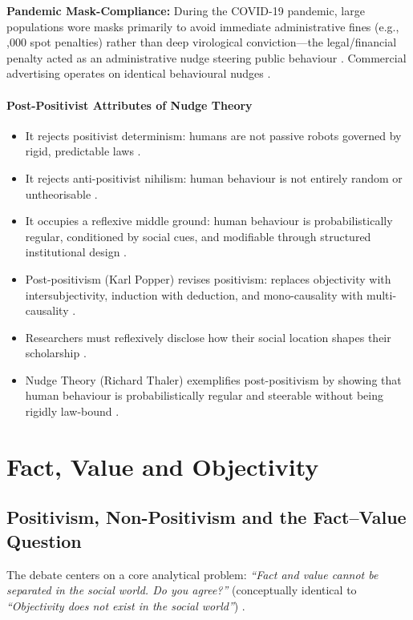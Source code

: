 \begin{ExampleBox}
\textbf{Pandemic Mask-Compliance:} During the COVID-19 pandemic, large populations wore masks primarily to avoid immediate administrative fines (e.g., ,000 spot penalties) rather than deep virological conviction---the legal/financial penalty acted as an administrative nudge steering public behaviour . Commercial advertising operates on identical behavioural nudges .
\end{ExampleBox}

\paragraph{Post-Positivist Attributes of Nudge Theory}
\begin{itemize}
    \item It rejects positivist determinism: humans are not passive robots governed by rigid, predictable laws .
    \item It rejects anti-positivist nihilism: human behaviour is not entirely random or untheorisable .
    \item It occupies a reflexive middle ground: human behaviour is probabilistically regular, conditioned by social cues, and modifiable through structured institutional design .
\end{itemize}

\begin{QuickRevision}
\begin{itemize}
    \item Post-positivism (Karl Popper) revises positivism: replaces objectivity with intersubjectivity, induction with deduction, and mono-causality with multi-causality .
    \item Researchers must reflexively disclose how their social location shapes their scholarship .
    \item Nudge Theory (Richard Thaler) exemplifies post-positivism by showing that human behaviour is probabilistically regular and steerable without being rigidly law-bound .
\end{itemize}
\end{QuickRevision}

\sectiondivider

\section{Fact, Value and Objectivity}

\subsection{Positivism, Non-Positivism and the Fact--Value Question}
The debate centers on a core analytical problem: \textit{``Fact and value cannot be separated in the social world. Do you agree?''} (conceptually identical to \textit{``Objectivity does not exist in the social world''}) .

